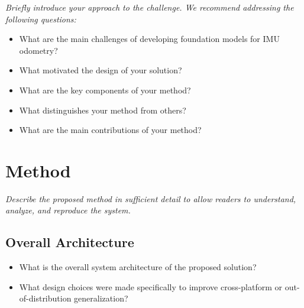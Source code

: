 \documentclass[letterpaper,10pt,conference]{ieeeconf}
\newcommand{\instruction}[1]{\textcolor{instructionblue}{\textit{#1}}}
\begin{document}
\instruction{
Briefly introduce your approach to the challenge.
We recommend addressing the following questions:
}

\begin{itemize}
    \item What are the main challenges of developing foundation models for IMU odometry?
    \item What motivated the design of your solution?
    \item What are the key components of your method?
    \item What distinguishes your method from others?
    \item What are the main contributions of your method?
    
    
\end{itemize}

\section{Method}

\instruction{
Describe the proposed method in sufficient detail to allow readers to understand,
analyze, and reproduce the system.
}

\subsection{Overall Architecture}

\begin{itemize}
    \item What is the overall system architecture of the proposed solution? 
    \item What design choices were made specifically to improve cross-platform
    or out-of-distribution generalization?
\end{itemize}
\end{document}
